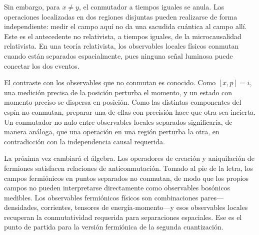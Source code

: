 Sin embargo, para \(x\neq y\), el conmutador a tiempos iguales se anula. Las operaciones localizadas en dos regiones disjuntas pueden realizarse de forma independiente: medir el campo aquí no da una sacudida cuántica al campo allí. Este es el antecedente no relativista, a tiempos iguales, de la microcausalidad relativista. En una teoría relativista, los observables locales físicos conmutan cuando están separados espacialmente, pues ninguna señal luminosa puede conectar los dos eventos.

El contraste con los observables que no conmutan es conocido. Como \([x,p]=i\), una medición precisa de la posición perturba el momento, y un estado con momento preciso se dispersa en posición. Como las distintas componentes del espín no conmutan, preparar una de ellas con precisión hace que otra sea incierta. Un conmutador no nulo entre observables locales separados significaría, de manera análoga, que una operación en una región perturba la otra, en contradicción con la independencia causal requerida.

\begin{classroomqa}
\end{classroomqa}

La próxima vez cambiará el álgebra. Los operadores de creación y aniquilación de fermiones satisfacen relaciones de anticonmutación. Tomado al pie de la letra, los campos fermiónicos en puntos separados no conmutan, de modo que los propios campos no pueden interpretarse directamente como observables bosónicos medibles. Los observables fermiónicos físicos son combinaciones pares---densidades, corrientes, tensores de energía-momento---y esos observables locales recuperan la conmutatividad requerida para separaciones espaciales. Ese es el punto de partida para la versión fermiónica de la segunda cuantización.
